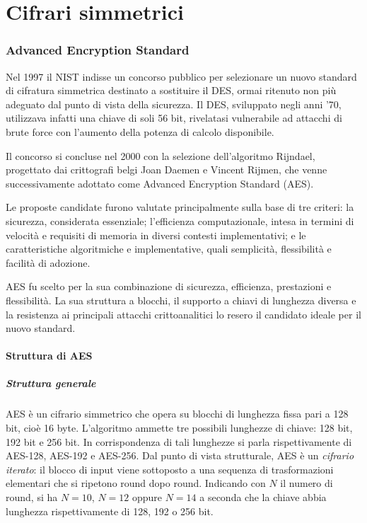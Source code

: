 \part{Cifrari simmetrici}

\newpage

\section{Advanced Encryption Standard}

Nel 1997 il NIST indisse un concorso pubblico per selezionare un nuovo standard di cifratura simmetrica destinato a
sostituire il DES, ormai ritenuto non più adeguato dal punto di vista della sicurezza. Il DES, sviluppato negli anni
'70, utilizzava infatti una chiave di soli 56 bit, rivelatasi vulnerabile ad attacchi di brute force con l'aumento
della potenza di calcolo disponibile.

Il concorso si concluse nel 2000 con la selezione dell'algoritmo Rijndael, progettato dai crittografi belgi Joan Daemen
e Vincent Rijmen, che venne successivamente adottato come Advanced Encryption Standard (AES).

Le proposte candidate furono valutate principalmente sulla base di tre criteri: la sicurezza, considerata essenziale;
l'efficienza computazionale, intesa in termini di velocità e requisiti di memoria in diversi contesti implementativi; e
le caratteristiche algoritmiche e implementative, quali semplicità, flessibilità e facilità di adozione.

AES fu scelto per la sua combinazione di sicurezza, efficienza, prestazioni e flessibilità. La sua struttura a blocchi,
il supporto a chiavi di lunghezza diversa e la resistenza ai principali attacchi crittoanalitici lo resero il candidato
ideale per il nuovo standard.

\subsection{Struttura di AES}

\subsubsection{Struttura generale}

AES è un cifrario simmetrico che opera su blocchi di lunghezza fissa pari a 128 bit, cioè 16 byte. L'algoritmo ammette
tre possibili lunghezze di chiave: 128 bit, 192 bit e 256 bit. In corrispondenza di tali lunghezze si parla
rispettivamente di AES-128, AES-192 e AES-256. Dal punto di vista strutturale, AES è un \emph{cifrario iterato}: il
blocco di input viene sottoposto a una sequenza di trasformazioni elementari che si ripetono round dopo round.
Indicando con $N$ il numero di round, si ha $N = 10$, $N = 12$ oppure $N = 14$ a seconda che la chiave abbia lunghezza
rispettivamente di 128, 192 o 256 bit.

